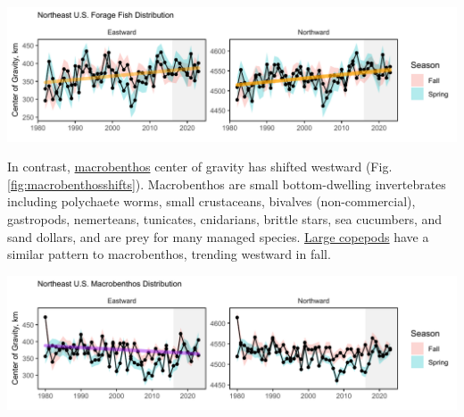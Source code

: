 \documentclass[
  10pt,
]{article}
\let\origfigure\figure
\let\endorigfigure\endfigure
\renewenvironment{figure}[1][2] {
    \expandafter\origfigure\expandafter[H]
} {
    \endorigfigure
}
\begin{document}
\begin{figure}

{\centering \includegraphics{midatlantic_files/figure-latex/forageshifts-1} 

}

\caption{Eastward (left) and northward (right) shifts in the center of gravity for 20 forage fish species on the Northeast U.S. Shelf, with increasing trend (orange) for fall eastward and northward center of gravity.}\label{fig:forageshifts}
\end{figure}

In contrast, \href{https://noaa-edab.github.io/catalog/benthos_index.html}{macrobenthos} center of gravity has shifted westward (Fig. \ref{fig:macrobenthosshifts}). Macrobenthos are small bottom-dwelling invertebrates including polychaete worms, small crustaceans, bivalves (non-commercial), gastropods, nemerteans, tunicates, cnidarians, brittle stars, sea cucumbers, and sand dollars, and are prey for many managed species. \href{https://noaa-edab.github.io/catalog/zooplankton_index.html\#key-results-and-visualizations-4}{Large copepods} have a similar pattern to macrobenthos, trending westward in fall.

\begin{figure}

{\centering \includegraphics{midatlantic_files/figure-latex/macrobenthosshifts-1} 

}

\caption{Eastward (left) and northward (right) shifts in the center of gravity for macrobenthos species on the Northeast U.S. Shelf}\label{fig:macrobenthosshifts}
\end{figure}
\end{document}
